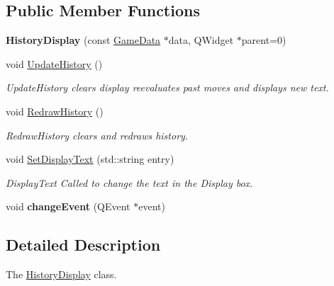 \subsection*{Public Member Functions}
\begin{DoxyCompactItemize}
\item 
\hypertarget{classHistoryDisplay_ad4b7962e85e825f2a1e0c90cf1f8e201}{{\bfseries History\-Display} (const \hyperlink{classGameData}{Game\-Data} $\ast$data, Q\-Widget $\ast$parent=0)}\label{classHistoryDisplay_ad4b7962e85e825f2a1e0c90cf1f8e201}

\item 
\hypertarget{classHistoryDisplay_a360a99566c00c9166ad3a0552e0d801e}{void \hyperlink{classHistoryDisplay_a360a99566c00c9166ad3a0552e0d801e}{Update\-History} ()}\label{classHistoryDisplay_a360a99566c00c9166ad3a0552e0d801e}

\begin{DoxyCompactList}\small\item\em Update\-History clears display reevaluates past moves and displays new text. \end{DoxyCompactList}\item 
\hypertarget{classHistoryDisplay_ad3359c47f96baa4747bf7dde034ab222}{void \hyperlink{classHistoryDisplay_ad3359c47f96baa4747bf7dde034ab222}{Redraw\-History} ()}\label{classHistoryDisplay_ad3359c47f96baa4747bf7dde034ab222}

\begin{DoxyCompactList}\small\item\em Redraw\-History clears and redraws history. \end{DoxyCompactList}\item 
void \hyperlink{classHistoryDisplay_a260307ebdade967004f32cf48f877915}{Set\-Display\-Text} (std\-::string entry)
\begin{DoxyCompactList}\small\item\em Display\-Text Called to change the text in the Display box. \end{DoxyCompactList}\item 
\hypertarget{classHistoryDisplay_a8c548187b6eb9152655f20b4f8cae402}{void {\bfseries change\-Event} (Q\-Event $\ast$event)}\label{classHistoryDisplay_a8c548187b6eb9152655f20b4f8cae402}

\end{DoxyCompactItemize}


\subsection{Detailed Description}
The \hyperlink{classHistoryDisplay}{History\-Display} class. 

